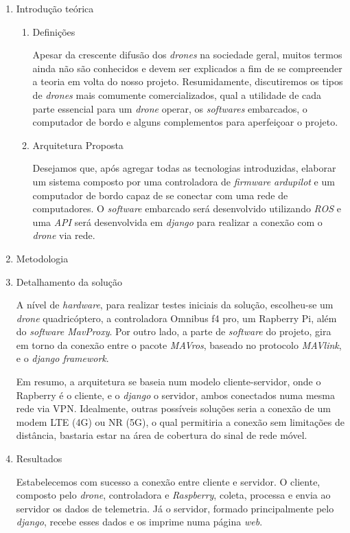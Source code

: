 \documentclass[12pt,a4paper,oneside]{book}
\begin{document}
\begin{enumerate}
     \item Introdução teórica 
     
     \begin{enumerate}
     
         \item Definições
         
         Apesar da crescente difusão dos \textit{drones} na sociedade geral, muitos termos ainda não são conhecidos e devem ser explicados a fim de se compreender a teoria em volta do nosso projeto. Resumidamente, discutiremos os tipos de \textit{drones} mais comumente comercializados, qual a utilidade de cada parte essencial para um \textit{drone} operar,  os \textit{softwares} embarcados, o computador de bordo e alguns complementos para aperfeiçoar o projeto.
         
         \item Arquitetura Proposta
 
         Desejamos que, após agregar todas as tecnologias introduzidas, elaborar um sistema composto por uma controladora de \textit{firmware ardupilot} e um computador de bordo capaz de se conectar com uma rede de computadores. O \textit{software} embarcado será desenvolvido utilizando \textit{ROS} e uma \textit{API} será desenvolvida em \textit{django} para realizar a conexão com o \textit{drone} via rede.
 
     \end{enumerate}
     
     \item Metodologia
 
     \item Detalhamento da solução \label{item:solucao}
     
     A nível de \textit{hardware}, para realizar testes iniciais da 
     solução, escolheu-se um \textit{drone} quadricóptero, a controladora 
     Omnibus f4 pro, um Rapberry Pi, além do \textit{software MavProxy}. 
     Por outro lado, a parte de \textit{software} do projeto, gira em torno
     da conexão entre o pacote \textit{MAVros}, baseado no protocolo 
     \textit{MAVlink}, e o \textit{django framework}.
     
     Em resumo, a
     arquitetura se baseia num modelo cliente-servidor, onde o Rapberry
     é o cliente, e o \textit{django} o servidor, ambos conectados numa mesma
     rede via VPN. Idealmente, outras possíveis soluções seria a conexão de
     um modem LTE (4G) ou NR (5G), o qual permitiria a conexão sem limitações de 
     distância, bastaria estar na área de cobertura do sinal de rede móvel.

     \item Resultados
     
     Estabelecemos com sucesso a conexão entre cliente e servidor. O cliente, composto
     pelo \textit{drone}, controladora e \textit{Raspberry}, coleta, processa e envia ao servidor os
     dados de telemetria. Já o servidor, formado principalmente pelo \textit{django},
     recebe esses dados e os imprime numa página \textit{web}.



\end{enumerate}
\end{document}
